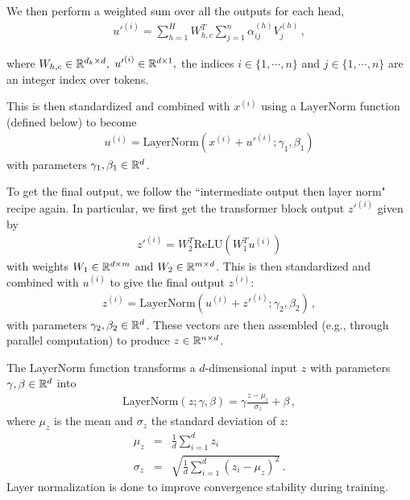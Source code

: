 We then perform a weighted sum over all the outputs for each head,
\begin{eqnarray}
  {u'}^{(i)} = \sum_{h=1}^H W^T_{h,c} \sum_{j=1}^{n} \alpha^{(h)}_{ij} V^{(h)}_j
  \,,
\end{eqnarray}

where $W_{h,c} \in \mathbb{R}^{d_k\times d},$ ${u'}^{(i)} \in \mathbb{R}^{d\times 1},$ the indices $i \in \{1,\cdots,n\}$ and $j \in \{1,\cdots,n\}$ are an integer index over tokens. 

This is then standardized and combined with $x^{(i)}$ using a $\text{LayerNorm}$ function (defined below) to become
\begin{eqnarray}
  {u}^{(i)} = \text{LayerNorm}\left(  x^{(i)} + {u'}^{(i)}; \gamma_1, \beta_1  \right)
\end{eqnarray}
with parameters $\gamma_1, \beta_1 \in \mathbb{R}^{d}$.

To get the final output, we follow the ``intermediate output then layer norm" recipe again. In particular, we first get the transformer block output ${z'}^{(i)}$ given by
\begin{eqnarray}
  {z'}^{(i)} = W_2^T \text{ReLU}\left( W_1^T u^{(i)} \right)
\end{eqnarray}
with weights $W_1\in \mathbb{R}^{d\times m}$ and $W_2\in \mathbb{R}^{m\times d}$.  This is then standardized and combined with $u^{(i)}$ to give the final output $z^{(i)}$:
\begin{eqnarray}
  {z}^{(i)} = \text{LayerNorm}\left(  u^{(i)} + {z'}^{(i)}; \gamma_2, \beta_2  \right)
  \,,
\end{eqnarray}
with parameters $\gamma_2, \beta_2 \in \mathbb{R}^{d}$.  These vectors are then assembled (e.g., through parallel computation) to produce $z\in \mathbb{R}^{n\times d}$.

The $\text{LayerNorm}$ function transforms a $d$-dimensional input $z$ with parameters $\gamma, \beta \in \mathbb{R}^d$ into
\begin{eqnarray}
  \text{LayerNorm}(z; \gamma, \beta) = \gamma \frac{z-\mu_z}{\sigma_z} + \beta
  \,,
\end{eqnarray}
where $\mu_z$ is the mean and $\sigma_z$ the standard deviation of $z$:
\begin{eqnarray}
  \mu_z &=& \frac{1}{d} \sum_{i=1}^d z_i
  \\
  \sigma_z &=& \sqrt{ \frac{1}{d} \sum_{i=1}^d (z_i-\mu_z)^2 }
  \,.
\end{eqnarray}
Layer normalization is done to improve convergence stability during training.

